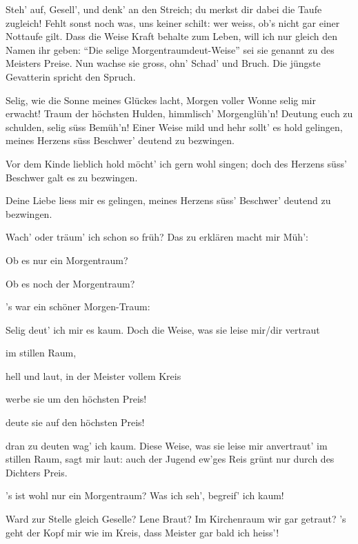 \begin{drama}
Steh' auf, Gesell', und denk' an den Streich;
du merkst dir dabei die Taufe zugleich!
Fehlt sonst noch was, uns keiner schilt:
wer weiss, ob's nicht gar einer Nottaufe gilt.
Dass die Weise Kraft behalte zum Leben,
will ich nur gleich den Namen ihr geben:
``Die selige Morgentraumdeut-Weise''
sei sie genannt zu des Meisters Preise.
Nun wachse sie gross, ohn' Schad' und Bruch.
Die jüngste Gevatterin spricht den Spruch.


\Evaspeaks
Selig, wie die Sonne
meines Glückes lacht,
Morgen voller Wonne
selig mir erwacht!
Traum der höchsten Hulden,
himmlisch' Morgenglüh'n!
Deutung euch zu schulden,
selig süss Bemüh'n!
Einer Weise mild und hehr
sollt' es hold gelingen,
meines Herzens süss Beschwer'
deutend zu bezwingen.

\Sachsspeaks
Vor dem Kinde lieblich hold
möcht' ich gern wohl singen;
doch des Herzens süss' Beschwer
galt es zu bezwingen.

\Waltherspeaks
Deine Liebe liess mir es gelingen,
meines Herzens süss' Beschwer' deutend zu bezwingen.

Wach' oder träum' ich schon so früh?
Das zu erklären macht mir Müh':

\Evaspeaks
Ob es nur ein Morgentraum?

\Waltherspeaks
Ob es noch der Morgentraum?

\Sachsspeaks
's war ein schöner Morgen-Traum:

Selig deut' ich mir es kaum.
Doch die Weise, was sie leise
mir/dir vertraut

\Waltherspeaks
im stillen Raum,

hell und laut,
in der Meister vollem Kreis

\Waltherspeaks
werbe sie um den höchsten Preis!

\Evaspeaks
deute sie auf den höchsten Preis!

\Sachsspeaks
dran zu deuten wag' ich kaum.
Diese Weise, was sie leise
mir anvertraut' im stillen Raum,
sagt mir laut:
auch der Jugend ew'ges Reis
grünt nur durch des Dichters Preis.

's ist wohl nur ein Morgentraum?
Was ich seh', begreif' ich kaum!

\Davidspeaks
Ward zur Stelle gleich Geselle?
Lene Braut?
Im Kirchenraum wir gar getraut?
's geht der Kopf mir wie im Kreis,
dass Meister gar bald ich heiss'!


\end{drama}
